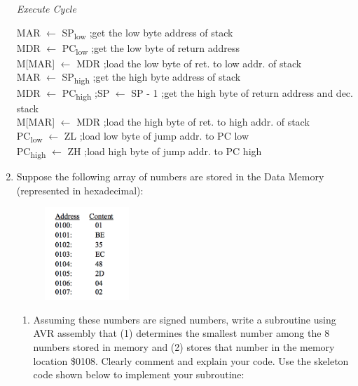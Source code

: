 \documentclass[12pt,letterpaper]{article}
\begin{document}
\begin{enumerate}
	\begin{center}
		\textit{Execute Cycle}
	\end{center}
	
	MAR $\leftarrow$ SP\textsubscript{low}	\hfill ;get the low byte address of stack
	\\
	MDR $\leftarrow$ PC\textsubscript{low} \hfill ;get the low byte of return address
	\\
	M[MAR] $\leftarrow$ MDR	\hfill ;load the low byte of ret. to low addr. of stack
	\\
	MAR $\leftarrow$ SP\textsubscript{high} \hfill  ;get the high byte address of stack
	\\
	MDR $\leftarrow$ PC\textsubscript{high} ;SP $\leftarrow$ SP - 1  \hfill ;get the high byte of return address and dec. stack
	\\
	M[MAR] $\leftarrow$ MDR  \hfill ;load the high byte of ret. to high addr. of stack
	\\
	PC\textsubscript{low} $\leftarrow$ ZL \hfill ;load low byte of jump addr. to PC low
	\\
	PC\textsubscript{high} $\leftarrow$ ZH  \hfill ;load high byte of jump addr. to PC high
	
	

	
	
	
	\clearpage
	\item
	Suppose the following array of numbers are stored in the Data Memory (represented in hexadecimal):
	\begin{figure}[h]
		\includegraphics[width=0.3\textwidth]{Q3.png}
	\end{figure}
 	
 	\begin{enumerate}
 		\item 
 		Assuming these numbers are signed numbers, write a subroutine using AVR assembly that (1) determines the smallest number among the 8 numbers stored in memory and (2) stores that number in the memory location \$0108. 
 		Clearly comment and explain your code. 
 		Use the skeleton code shown below to implement your subroutine: 
 		

\end{enumerate}
\end{enumerate}
\end{document}
